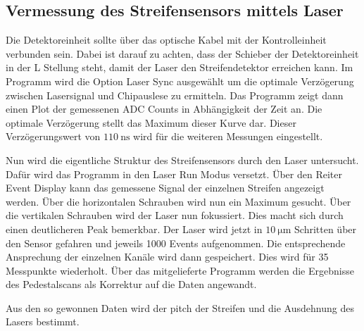 \subsection{Vermessung des Streifensensors mittels Laser}
\label{sec:laserdurch}

Die Detektoreinheit sollte über das optische Kabel mit der Kontrolleinheit verbunden sein.
Dabei ist darauf zu achten, dass der Schieber der Detektoreinheit in der L Stellung steht, damit der Laser den Streifendetektor erreichen kann.
Im Programm wird die Option Laser Sync ausgewählt um die optimale Verzögerung zwischen Lasersignal und Chipauslese zu ermitteln.
Das Programm zeigt dann einen Plot der gemessenen ADC Counts in Abhängigkeit der Zeit an.
Die optimale Verzögerung stellt das Maximum dieser Kurve dar.
Dieser Verzögerungswert von $\SI{110}{\nano\second}$ wird für die weiteren Messungen eingestellt.

Nun wird die eigentliche Struktur des Streifensensors durch den Laser untersucht.
Dafür wird das Programm in den Laser Run Modus versetzt.
Über den Reiter Event Display kann das gemessene Signal der einzelnen Streifen angezeigt werden.
Über die horizontalen Schrauben wird nun ein Maximum gesucht.
Über die vertikalen Schrauben wird der Laser nun fokussiert.
Dies macht sich durch einen deutlicheren Peak bemerkbar.
Der Laser wird jetzt in $\SI{10}{\micro\metre}$ Schritten über den Sensor gefahren und jeweils 1000 Events aufgenommen.
Die entsprechende Ansprechung der einzelnen Kanäle wird dann gespeichert.
Dies wird für 35 Messpunkte wiederholt.
Über das mitgelieferte Programm werden die Ergebnisse des Pedestalscans als Korrektur auf die Daten angewandt.

Aus den so gewonnen Daten wird der pitch der Streifen und die Ausdehnung des Lasers bestimmt.
